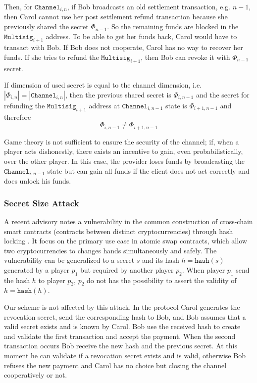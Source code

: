 \documentclass{llncs}
\begin{document}
Then, for $\texttt{Channel}_{i,n}$, if Bob broadcasts an old settlement
transaction, e.g. $n-1$, then Carol cannot use her post settlement refund
transaction because she previously shared the secret $\Phi_{n-1}$. So the
remaining funds are blocked in the $\texttt{Multisig}_{i+1}$ address. To be able
to get her funds back, Carol would have to transact with Bob. If Bob does not
cooperate, Carol has no way to recover her funds. If she tries to refund the
$\texttt{Multisig}_{i+1}$, then Bob can revoke it with $\Phi_{n-1}$ secret.

If dimension of used secret is equal to the channel dimension, i.e.
$|\Phi_{i,n}| = |\texttt{Channel}_{i,n}|$, then the previous shared secret is
$\Phi_{i,n-1}$ and the secret for refunding the $\texttt{Multisig}_{i+1}$
address at $\texttt{Channel}_{i,n-1}$ state is $\Phi_{i+1,n-1}$ and therefore
\[ \Phi_{i,n-1} \neq \Phi_{i+1,n-1}
\]

Game theory is not sufficient to ensure the security of the channel; if, when a
player acts dishonestly, there exists an incentive to gain, even
probabilistically, over the other player. In this case, the provider loses funds
by broadcasting the $\texttt{Channel}_{i,n-1}$ state but can gain all funds if
the client does not act correctly and does unlock his funds.

\subsubsection{Secret Size Attack} A recent advisory notes a vulnerability in
the common construction of cross-chain smart contracts (contracts between
distinct cryptocurrencies) through hash locking \cite{SecretSizeAttack}. It
focus on the primary use case in atomic swap contracts, which allow two
cryptocurrencies to changes hands simultaneously and safely. The vulnerability
can be generalized to a secret $s$ and its hash $h = \texttt{hash}(s)$ generated
by a player $p_1$ but required by another player $p_2$. When player $p_1$ send
the hash $h$ to player $p_2$, $p_2$ do not has the possibility to assert the
validity of $h = \texttt{hash}(h)$.

Our scheme is not affected by this attack. In the protocol Carol generates the
revocation secret, send the corresponding hash to Bob, and Bob assumes that a
valid secret exists and is known by Carol. Bob use the received hash to create
and validate  the first transaction and accept the payment. When the second
transaction occurs Bob receive the new hash and the previous secret. At this
moment he can validate  if a revocation secret exists and is valid, otherwise
Bob refuses the new payment and Carol has no choice but closing the channel
cooperatively or not.
\end{document}
